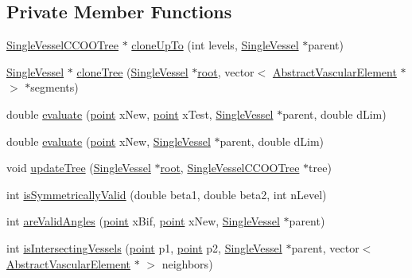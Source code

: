 \subsection*{Private Member Functions}
\begin{DoxyCompactItemize}
\item 
\hyperlink{class_single_vessel_c_c_o_o_tree}{Single\+Vessel\+C\+C\+O\+O\+Tree} $\ast$ \hyperlink{class_single_vessel_c_c_o_o_tree_afcabe5e4cb15ffdb18097c28ecc72e44}{clone\+Up\+To} (int levels, \hyperlink{class_single_vessel}{Single\+Vessel} $\ast$parent)
\item 
\hyperlink{class_single_vessel}{Single\+Vessel} $\ast$ \hyperlink{class_single_vessel_c_c_o_o_tree_a0abd690f43508e6857c6f06d2a020300}{clone\+Tree} (\hyperlink{class_single_vessel}{Single\+Vessel} $\ast$\hyperlink{class_abstract_object_c_c_o_tree_ae1b17938ad34d92629915159c49bb89a}{root}, vector$<$ \hyperlink{class_abstract_vascular_element}{Abstract\+Vascular\+Element} $\ast$ $>$ $\ast$segments)
\item 
double \hyperlink{class_single_vessel_c_c_o_o_tree_ac0580b83043a18855988071a2a3f4913}{evaluate} (\hyperlink{structpoint}{point} x\+New, \hyperlink{structpoint}{point} x\+Test, \hyperlink{class_single_vessel}{Single\+Vessel} $\ast$parent, double d\+Lim)
\item 
double \hyperlink{class_single_vessel_c_c_o_o_tree_a154064bf9792abee19671f39c851eb25}{evaluate} (\hyperlink{structpoint}{point} x\+New, \hyperlink{class_single_vessel}{Single\+Vessel} $\ast$parent, double d\+Lim)
\item 
void \hyperlink{class_single_vessel_c_c_o_o_tree_ac8d4ca178e13ed388ad5fe0411ca0b75}{update\+Tree} (\hyperlink{class_single_vessel}{Single\+Vessel} $\ast$\hyperlink{class_abstract_object_c_c_o_tree_ae1b17938ad34d92629915159c49bb89a}{root}, \hyperlink{class_single_vessel_c_c_o_o_tree}{Single\+Vessel\+C\+C\+O\+O\+Tree} $\ast$tree)
\item 
int \hyperlink{class_single_vessel_c_c_o_o_tree_a83661a533a356d3631696b32dee89632}{is\+Symmetrically\+Valid} (double beta1, double beta2, int n\+Level)
\item 
int \hyperlink{class_single_vessel_c_c_o_o_tree_af22f75c20461e0ad6a2505b5bffd6128}{are\+Valid\+Angles} (\hyperlink{structpoint}{point} x\+Bif, \hyperlink{structpoint}{point} x\+New, \hyperlink{class_single_vessel}{Single\+Vessel} $\ast$parent)
\item 
int \hyperlink{class_single_vessel_c_c_o_o_tree_a7ac08a2e8d1b05eea1d6debf109caaf1}{is\+Intersecting\+Vessels} (\hyperlink{structpoint}{point} p1, \hyperlink{structpoint}{point} p2, \hyperlink{class_single_vessel}{Single\+Vessel} $\ast$parent, vector$<$ \hyperlink{class_abstract_vascular_element}{Abstract\+Vascular\+Element} $\ast$ $>$ neighbors)

\end{DoxyCompactItemize}
